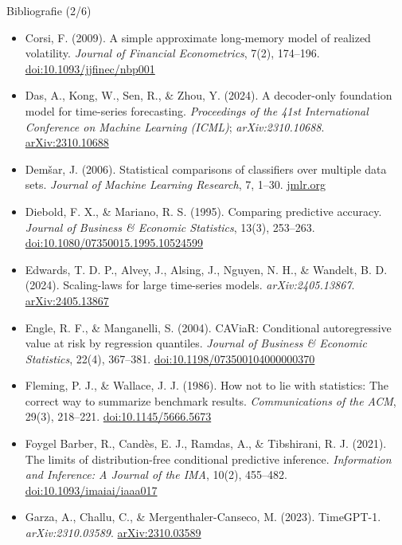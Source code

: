 \begin{frame}{Bibliografie (2/6)}
\itemsize{\tiny}
\begin{itemize}
    \item Corsi, F. (2009). A simple approximate long-memory model of realized volatility. \textit{Journal of Financial Econometrics}, 7(2), 174--196. \href{https://doi.org/10.1093/jjfinec/nbp001}{doi:10.1093/jjfinec/nbp001}
    \item Das, A., Kong, W., Sen, R., \& Zhou, Y. (2024). A decoder-only foundation model for time-series forecasting. \textit{Proceedings of the 41st International Conference on Machine Learning (ICML)}; \textit{arXiv:2310.10688}. \href{https://arxiv.org/abs/2310.10688}{arXiv:2310.10688}
    \item Demšar, J. (2006). Statistical comparisons of classifiers over multiple data sets. \textit{Journal of Machine Learning Research}, 7, 1--30. \href{https://jmlr.org/papers/v7/demsar06a.html}{jmlr.org}
    \item Diebold, F. X., \& Mariano, R. S. (1995). Comparing predictive accuracy. \textit{Journal of Business \& Economic Statistics}, 13(3), 253--263. \href{https://doi.org/10.1080/07350015.1995.10524599}{doi:10.1080/07350015.1995.10524599}
    \item Edwards, T. D. P., Alvey, J., Alsing, J., Nguyen, N. H., \& Wandelt, B. D. (2024). Scaling-laws for large time-series models. \textit{arXiv:2405.13867}. \href{https://arxiv.org/abs/2405.13867}{arXiv:2405.13867}
    \item Engle, R. F., \& Manganelli, S. (2004). CAViaR: Conditional autoregressive value at risk by regression quantiles. \textit{Journal of Business \& Economic Statistics}, 22(4), 367--381. \href{https://doi.org/10.1198/073500104000000370}{doi:10.1198/073500104000000370}
    \item Fleming, P. J., \& Wallace, J. J. (1986). How not to lie with statistics: The correct way to summarize benchmark results. \textit{Communications of the ACM}, 29(3), 218--221. \href{https://doi.org/10.1145/5666.5673}{doi:10.1145/5666.5673}
    \item Foygel Barber, R., Candès, E. J., Ramdas, A., \& Tibshirani, R. J. (2021). The limits of distribution-free conditional predictive inference. \textit{Information and Inference: A Journal of the IMA}, 10(2), 455--482. \href{https://doi.org/10.1093/imaiai/iaaa017}{doi:10.1093/imaiai/iaaa017}
    \item Garza, A., Challu, C., \& Mergenthaler-Canseco, M. (2023). TimeGPT-1. \textit{arXiv:2310.03589}. \href{https://arxiv.org/abs/2310.03589}{arXiv:2310.03589}

\end{itemize}
\end{frame}
